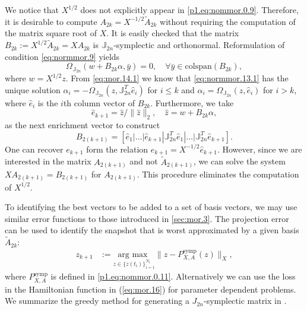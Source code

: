 We notice that $X^{1/2}$ does not explicitly appear in \eqref{p1.eq:nommor.0.9}. Therefore, it is desirable to compute $A_{2k} = X^{-1/2} \tilde A_{2k}$ without requiring the computation of the matrix square root of $X$. It is easily checked that the matrix $B_{2k}:=X^{1/2} \tilde A_{2k} = XA_{2k}$ is $\mathbb J_{2n}$-symplectic and orthonormal. Reformulation of condition \cref{eq:normmor.9} yields
\begin{equation} \label{eq:normmor.13.1}
	\Omega_{\mathbb J_{2n}}\left( w + B_{2k} \alpha, \bar y \right) = 0, \quad \forall \bar y \in \text{colspan}(B_{2k}),
\end{equation}
where $w = X^{1/2}z$. From \cref{eq:mor.14.1} we know that \cref{eq:normmor.13.1} has the unique solution $\alpha_i = - \Omega_{\mathbb J_{2n}}(z,\mathbb J_{2n}^T \hat e_i)$ for $i\leq k$ and $\alpha_i = \Omega_{\mathbb J_{2n}}(z,\hat e_i)$ for $i>k$, where $\hat e_i$ is the $i$th column vector of $B_{2k}$. Furthermore, we take 
\begin{equation}
	\hat e_{k+1} = \hat z / \| \hat z \|_2, \quad \hat z = w + B_{2k} \alpha,
\end{equation}
as the next enrichment vector to construct
\begin{equation}
	B_{2(k+1)} = [ \hat e_1 | \dots | \hat e_{k+1} | \mathbb J_{2n}^T \hat e_1 | \dots | \mathbb J_{2n}^T \hat e_{k+1} ].
\end{equation}
One can recover $e_{k+1}$ form the relation $e_{k+1} = X^{-1/2} \hat e_{k+1}$. However, since we are interested in the matrix $A_{2(k+1)}$ and not $\tilde A_{2(k+1)}$, we can solve the system $XA_{2(k+1)} = B_{2(k+1)}$ for $A_{2(k+1)}$. This procedure eliminates the computation of $X^{1/2}$.

To identifying the best vectors to be added to a set of basis vectors, we may use similar error functions to those introduced in \cref{sec:mor.3}. The projection error can be used to identify the snapshot that is worst approximated by a given basis $\tilde A_{2k}$:
\begin{equation} \label{eq:normmor.14}
\begin{aligned}
	z_{k+1} &:= \underset{z\in\{ z(t_i)\}_{i=1}^{N_t}}{\text{arg\ max } }\| z - P_{X,A}^{\text{symp}}(z) \|_X,
\end{aligned}
\end{equation}
where $P_{X,A}^{\text{symp}}$ is defined in \eqref{p1.eq:nommor.0.11}. Alternatively we can use the loss in the Hamiltonian function in (\ref{eq:mor.16}) for parameter dependent problems. We summarize the greedy method for generating a $J_{2n}$-symplectic matrix in .

